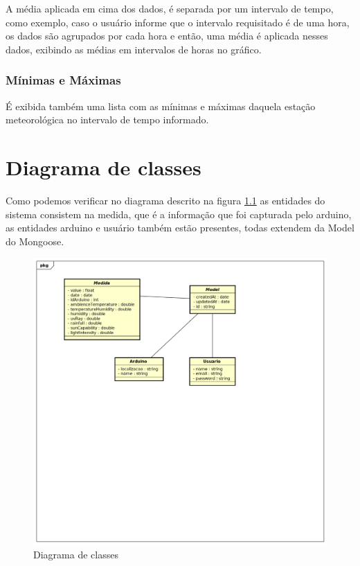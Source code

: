 A média aplicada em cima dos dados, é separada por um intervalo de tempo, como exemplo, caso o usuário informe que o intervalo requisitado é de uma hora, os dados são agrupados por cada hora e então, uma média é aplicada nesses dados, exibindo as médias em intervalos de horas no gráfico.

\subsection{Mínimas e Máximas}

É exibida também uma lista com as mínimas e máximas daquela estação meteorológica no intervalo de tempo informado.

\chapter{Diagrama de classes}

Como podemos verificar no diagrama descrito na figura \ref{figure_diagrama_classe} as entidades do sistema consistem na medida, que é a informação que foi capturada pelo arduino, as entidades arduino e usuário também estão presentes, todas extendem da Model do Mongoose.

\begin{figure}[H]
    \label{figure_diagrama_classe}
    \centering
    \caption{Diagrama de classes}
    \includegraphics[scale=0.5]{diagrams/classe.png}
    \hfill
\end{figure}


